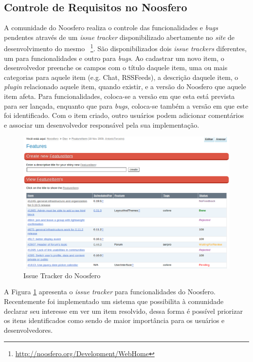\subsection{Controle de Requisitos no Noosfero}

A comunidade do Noosfero realiza o controle das funcionalidades e \textit{bugs}
pendentes através de um \textit{issue tracker} disponibilizado abertamente no
\textit{site} de desenvolvimento do mesmo
~\footnote{\url{http://noosfero.org/Development/WebHome}}. São disponibilizados
dois \textit{issue trackers} diferentes, um para funcionalidades e outro para
\textit{bugs}. Ao cadastrar um novo item, o desenvolvedor preenche os campos
com o título daquele item, uma ou mais categorias para aquele item (e.g. Chat,
RSSFeeds), a descrição daquele item, o \textit{plugin} relacionado aquele item,
quando existir, e a versão do Noosfero que aquele item afeta. Para funcionalidades,
coloca-se a versão em que esta está prevista para ser lançada, enquanto que para
\textit{bugs}, coloca-se também a versão em que este foi identificado. Com o item
criado, outro usuários podem adicionar comentários e associar um desenvolvedor
responsável pela sua implementação.

\begin{figure}[h]
	\centering
	\includegraphics[keepaspectratio=true,scale=0.4]
	  {figuras/issue-tracker.eps}
	\caption{Issue Tracker do Noosfero}
	\label{issue-tracker}
\end{figure}

A Figura \ref{issue-tracker} apresenta o \textit{issue tracker} para
funcionalidades do Noosfero.
%
Recentemente foi implementado um sistema que possibilita à comunidade declarar
seu interesse em ver um item resolvido, dessa forma é possível priorizar os
itens identificados como sendo de maior importância para os usuários e
desenvolvedores.

